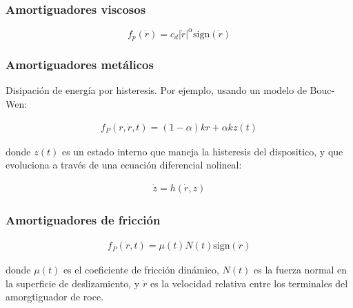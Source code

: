

\subsubsection{Amortiguadores viscosos}

\begin{equation}
    f_p(\dot{r}) = c_d |\dot{r}|^\alpha \text{sign}(\dot{r})
\end{equation}

\subsubsection{Amortiguadores metálicos}

Disipación de energía por histeresis. Por ejemplo, usando un modelo de Bouc-Wen:

\begin{align}
    f_P(r,\dot{r},t) = (1-\alpha) k r +  \alpha k z(t)
\end{align}

donde $z(t)$ es un estado interno que maneja la histeresis del dispositico, y que evoluciona a través de una ecuación diferencial nolineal:

\begin{align}
    \dot{z} = h(\dot{r},z)
\end{align}

\subsubsection{Amortiguadores de fricción}

\begin{align}
    f_P(\dot{r},t) = \mu(t) N(t) \text{sign}(\dot{r})
\end{align}

donde $\mu(t)$ es el coeficiente de fricción dinámico, $N(t)$ es la fuerza normal en la superficie de deslizamiento, y $\dot{r}$ es la velocidad relativa entre los terminales del amorgtiguador de roce.


